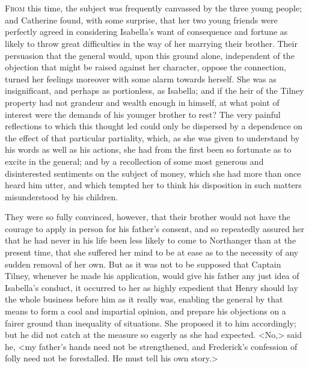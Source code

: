 \chapter[Chapter \thechapter]{} 

 \lettrine{F}{rom} this time, the subject was frequently canvassed by the three young people; and Catherine found, with some surprise, that her two young friends were perfectly agreed in considering Isabella's want of consequence and fortune as likely to throw great difficulties in the way of her marrying their brother. Their persuasion that the general would, upon this ground alone, independent of the objection that might be raised against her character, oppose the connection, turned her feelings moreover with some alarm towards herself. She was as insignificant, and perhaps as portionless, as Isabella; and if the heir of the Tilney property had not grandeur and wealth enough in himself, at what point of interest were the demands of his younger brother to rest? The very painful reflections to which this thought led could only be dispersed by a dependence on the effect of that particular partiality, which, as she was given to understand by his words as well as his actions, she had from the first been so fortunate as to excite in the general; and by a recollection of some most generous and disinterested sentiments on the subject of money, which she had more than once heard him utter, and which tempted her to think his disposition in such matters misunderstood by his children. 

 They were so fully convinced, however, that their brother would not have the courage to apply in person for his father's consent, and so repeatedly assured her that he had never in his life been less likely to come to Northanger than at the present time, that she suffered her mind to be at ease as to the necessity of any sudden removal of her own. But as it was not to be supposed that Captain Tilney, whenever he made his application, would give his father any just idea of Isabella's conduct, it occurred to her as highly expedient that Henry should lay the whole business before him as it really was, enabling the general by that means to form a cool and impartial opinion, and prepare his objections on a fairer ground than inequality of situations. She proposed it to him accordingly; but he did not catch at the measure so eagerly as she had expected. <No,> said he, <my father's hands need not be strengthened, and Frederick's confession of folly need not be forestalled. He must tell his own story.> 

